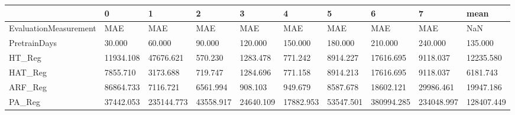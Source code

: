 \begin{tabular}{llllllllll}
\toprule
{} &         0 &          1 &         2 &         3 &         4 &         5 &          6 &          7 &       mean \\
\midrule
EvaluationMeasurement &       MAE &        MAE &       MAE &       MAE &       MAE &       MAE &        MAE &        MAE &        NaN \\
PretrainDays          &    30.000 &     60.000 &    90.000 &   120.000 &   150.000 &   180.000 &    210.000 &    240.000 &    135.000 \\
HT\_Reg                & 11934.108 &  47676.621 &   570.230 &  1283.478 &   771.242 &  8914.227 &  17616.695 &   9118.037 &  12235.580 \\
HAT\_Reg               &  7855.710 &   3173.688 &   719.747 &  1284.696 &   771.158 &  8914.213 &  17616.695 &   9118.037 &   6181.743 \\
ARF\_Reg               & 86864.733 &   7116.721 &  6561.994 &   908.103 &   949.679 &  8587.678 &  18602.121 &  29986.461 &  19947.186 \\
PA\_Reg                & 37442.053 & 235144.773 & 43558.917 & 24640.109 & 17882.953 & 53547.501 & 380994.285 & 234048.997 & 128407.449 \\
\bottomrule
\end{tabular}
